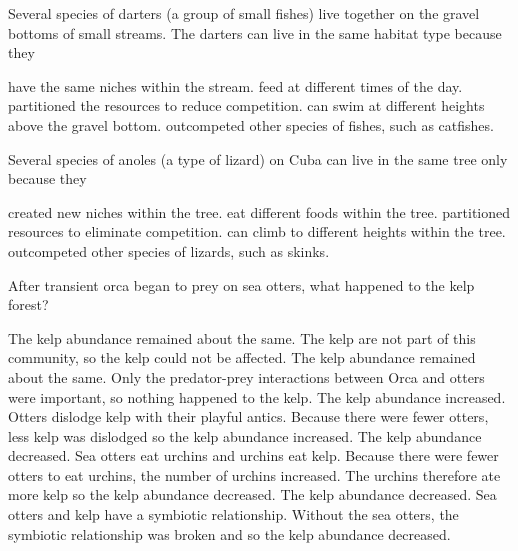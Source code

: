 \question
Several species of darters (a group of small fishes) live together on the gravel bottoms of small streams. The darters can live in the same habitat type  because they

\begin{choices}
\choice have the same niches within the stream.%
\choice feed at different times of the day.%
\correctchoice partitioned the resources to reduce competition.%
\choice can swim at different heights above the gravel bottom.%
\choice outcompeted other species of fishes, such as catfishes.%
\end{choices}

\question
Several species of anoles (a type of lizard) on Cuba can live in the same tree only because they

\begin{choices}
\choice created new niches within the tree.%
\choice eat different foods within the tree.%
\correctchoice partitioned resources to eliminate competition.%
\choice can climb to different heights within the tree.%
\choice outcompeted other species of lizards, such as skinks.%
\end{choices}


\question
After transient orca began to prey on sea otters, what happened to the kelp forest?

\begin{choices}
\choice The kelp abundance remained about the same. The kelp are not part of this community, so the kelp could not be affected.%
\choice The kelp abundance remained about the same. Only the predator-prey interactions between Orca and otters were important, so nothing happened to the kelp.%
\choice The kelp abundance increased. Otters dislodge kelp with their playful antics.  Because there were fewer otters, less kelp was dislodged so the kelp abundance increased.%
\correctchoice The kelp abundance decreased. Sea otters eat urchins and urchins eat kelp.  Because there were fewer otters to eat urchins, the number of urchins increased.  The urchins therefore ate more kelp so the kelp abundance decreased.%
\choice The kelp abundance decreased. Sea otters and kelp have a symbiotic relationship. Without the sea otters, the symbiotic relationship was broken and so the kelp abundance decreased.%
\end{choices}


